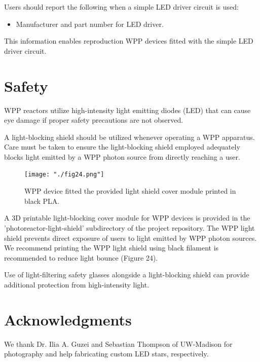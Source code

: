 \documentclass[11pt]{article}
\let\stdsection\section
\renewcommand\section{\clearpage\stdsection}
\begin{document}
Users should report the following when a simple LED driver circuit is used:

\begin{itemize}
	\item Manufacturer and part number for LED driver.
\end{itemize}

This information enables reproduction WPP devices fitted with the simple LED driver circuit.

\section{Safety}

WPP reactors utilize high-intensity light emitting diodes (LED) that can cause eye damage if proper safety precautions are not observed.

A light-blocking shield should be utilized whenever operating a WPP apparatus. 
Care must be taken to ensure the light-blocking shield employed adequately blocks light emitted by a WPP photon source from directly reaching a user.

\begin{figure}[H]
	\centering
	\texttt{[image: "./fig24.png"]}
	\caption{WPP device fitted the provided light shield cover module printed in black PLA.}
\end{figure}

A 3D printable light-blocking cover module for WPP devices is provided in the 'photoreactor-light-shield' subdirectory of the project repository.
The WPP light shield prevents direct exposure of users to light emitted by WPP photon sources. 
We recommend printing the WPP light shield using black filament is recommended to reduce light bounce (Figure 24).

Use of light-filtering safety glasses alongside a light-blocking shield can provide additional protection from high-intensity light.

\section{Acknowledgments}

We thank Dr. Ilia A. Guzei and Sebastian Thompson of UW-Madison for photography and help fabricating custom LED stars, respectively. 
\end{document}
